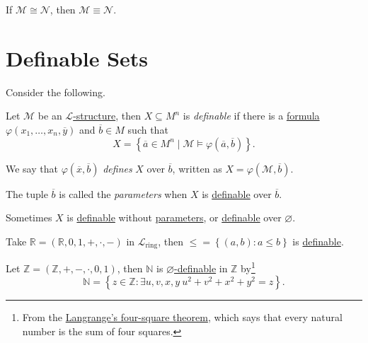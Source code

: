 \begin{corollary}
	If \(\mathcal{M} \cong \mathcal{N} \), then \(\mathcal{M} \equiv \mathcal{N} \).
\end{corollary}

\section{Definable Sets}
Consider the following.

\begin{definition}[Definable]\label{def:definable}
	Let \(\mathcal{M} \) be an \hyperref[def:structure]{\(\mathcal{L} \)-structure}, then \(X \subseteq M^n\) is \emph{definable} if there is a \hyperref[def:formula]{formula} \(\varphi (x_1, \dots , x_n, \overline{y} )\) and \(\overline{b} \in M\) such that
	\[
		X = \left\{ \overline{a} \in M^n \mid \mathcal{M} \models \varphi (\overline{a} , \overline{b} ) \right\}.
	\]
\end{definition}

\begin{notation}[Define]\label{not:define}
	We say that \(\varphi (\overline{x} , \overline{b} )\) \emph{defines} \(X\) over \(\overline{b} \), written as \(X = \varphi (\mathcal{M} , \overline{b} )\).
\end{notation}

\begin{notation}[Parameter]\label{not:parameter}
	The tuple \(\overline{b} \) is called the \emph{parameters} when \(X\) is \hyperref[def:definable]{definable} over \(\overline{b} \).
\end{notation}

\begin{remark}
	Sometimes \(X\) is \hyperref[def:definable]{definable} without \hyperref[not:parameter]{parameters}, or \hyperref[def:definable]{definable} over \(\varnothing \).
\end{remark}

\begin{eg}
	Take \(\mathbb{R} =(\mathbb{R} , 0, 1, +, \cdot, -)\) in \(\mathcal{L} _{\text{ring} }\), then \(\leq = \left\{ (a, b) \colon a \leq b\right\}\) is \hyperref[def:definable]{definable}.
\end{eg}

\begin{eg}
	Let \(\mathbb{Z} =(\mathbb{Z} , +, -, \cdot, 0, 1)\), then \(\mathbb{N} \) is \hyperref[def:definable]{\(\varnothing \)-definable} in \(\mathbb{Z} \) by\footnote{From the \href{https://en.wikipedia.org/wiki/Lagrange's_four-square_theorem}{Langrange's four-square theorem}, which says that every natural number is the sum of four squares.}
	\[
		\mathbb{N} = \left\{ z\in \mathbb{Z} \colon \exists u, v, x, y\ u^2 + v^2 + x^2 + y^2 = z \right\}.
	\]
\end{eg}

